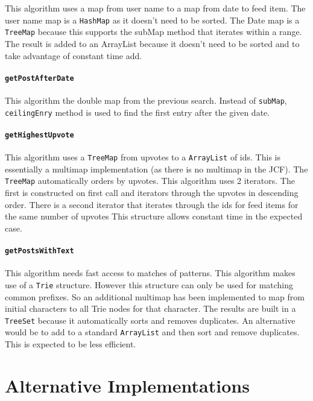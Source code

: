 \documentclass[11pt, oneside]{article}   	%
\begin{document}
This algorithm uses a map from user name to a map from date to feed item. The user name map is a \texttt{HashMap} as it doesn't need to be sorted. The Date map is a \texttt{TreeMap} because this supports the subMap method that iterates within a range. The result is added to an ArrayList because it doesn't need to be sorted and to take advantage of constant time add.

\paragraph{\texttt{getPostAfterDate}}

This algorithm the double map from the previous search. Instead of \texttt{subMap}, \texttt{ceilingEnry} method is used to find the first entry after the given date.

\paragraph{\texttt{getHighestUpvote}}

This algorithm uses a \texttt{TreeMap} from upvotes to a \texttt{ArrayList} of ids. This is essentially a multimap implementation (as there is no multimap in the JCF). The \texttt{TreeMap} automatically orders by upvotes. This algorithm uses 2 iterators. The first is constructed on first call and iterators through the upvotes in descending order. There is a second iterator that iterates through the ids for feed items for the same number of upvotes This structure allows constant time in the expected case.

\paragraph{\texttt{getPostsWithText}}

This algorithm needs fast access to matches of patterns. This algorithm makes use of a \texttt{Trie} structure. However this structure can only be used for matching common prefixes.  So an additional multimap has been implemented to map from initial characters to all Trie nodes for that character. The results are built in a \texttt{TreeSet} because it automatically sorts and removes duplicates. An alternative would be to add to a standard \texttt{ArrayList} and then sort and remove duplicates. This is expected to be less efficient.

\section{Alternative Implementations}
\end{document}
